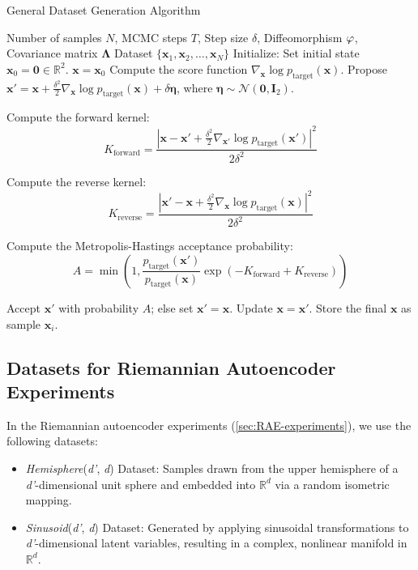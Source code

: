 \begin{algorithm}[h]
\caption{General Dataset Generation Algorithm}
\label{alg:Langevin MCMC with M-H correction}
\begin{algorithmic}[1]
\REQUIRE Number of samples $N$, MCMC steps $T$, Step size $\delta$, Diffeomorphism $\varphi$, Covariance matrix $\mathbf{\Lambda}$
\ENSURE Dataset $\{\mathbf{x}_1, \mathbf{x}_2, \dots, \mathbf{x}_N\}$
\STATE Initialize: Set initial state $\mathbf{x}_0 = \mathbf{0} \in \mathbb{R}^2$.
    \STATE $\mathbf{x} = \mathbf{x}_0$
        \STATE Compute the score function $\nabla_{\mathbf{x}} \log p_{\text{target}}(\mathbf{x})$.
        \STATE Propose $\mathbf{x}' = \mathbf{x} + \frac{\delta^2}{2} \nabla_{\mathbf{x}} \log p_{\text{target}}(\mathbf{x}) + \delta \boldsymbol{\eta}$, where $\boldsymbol{\eta} \sim \mathcal{N}(\mathbf{0}, \mathbf{I}_2)$.
        
        \STATE Compute the forward kernel:
        \[
        K_{\text{forward}} = \frac{|\mathbf{x} - \mathbf{x}' + \frac{\delta^2}{2} \nabla_{\mathbf{x}'} \log p_{\text{target}}(\mathbf{x}')|^2}{2\delta^2}
        \]

        \STATE Compute the reverse kernel:
        \[
        K_{\text{reverse}} = \frac{|\mathbf{x}' - \mathbf{x} + \frac{\delta^2}{2} \nabla_{\mathbf{x}} \log p_{\text{target}}(\mathbf{x})|^2}{2\delta^2}
        \]
        
        \STATE Compute the Metropolis-Hastings acceptance probability:
        \[
        A = \min\left(1, \frac{p_{\text{target}}(\mathbf{x}')}{p_{\text{target}}(\mathbf{x})} \exp\left( -K_{\text{forward}} + K_{\text{reverse}} \right) \right)
        \]
        
        \STATE Accept $\mathbf{x}'$ with probability $A$; else set $\mathbf{x}' = \mathbf{x}$.
        \STATE Update $\mathbf{x} = \mathbf{x}'$.
    \ENDFOR
    \STATE Store the final $\mathbf{x}$ as sample $\mathbf{x}_i$.
\ENDFOR
\end{algorithmic}
\end{algorithm}

\subsection{Datasets for Riemannian Autoencoder Experiments}
\label{app:rae_datasets}

In the Riemannian autoencoder experiments (\ref{sec:RAE-experiments}), we use the following datasets:
\begin{itemize}
    \item \textit{Hemisphere}(\textit{d'}, \textit{d}) Dataset: Samples drawn from the upper hemisphere of a \textit{d'}-dimensional unit sphere and embedded into $\mathbb{R}^d$ via a random isometric mapping.
    \item \textit{Sinusoid}(\textit{d'}, \textit{d}) Dataset: Generated by applying sinusoidal transformations to \textit{d'}-dimensional latent variables, resulting in a complex, nonlinear manifold in $\mathbb{R}^d$.
\end{itemize}

